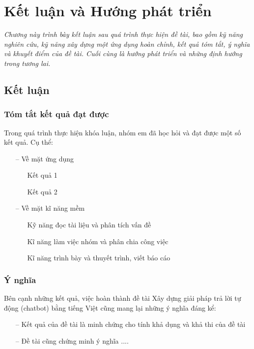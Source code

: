 \chapter{Kết luận và Hướng phát triển}
\label{Chapter6}

\emph{Chương này trình bày kết luận sau quá trình thực hiện đề tài, bao gồm kỹ năng nghiên cứu, kỹ năng xây dựng một ứng dụng hoàn chỉnh, kết quả tóm tắt, ý nghĩa và khuyết điểm của đề tài. Cuối cùng là hướng phát triển và những định hướng trong tương lai.}

\section{Kết luận}
\label{sec:ket-luan}

\subsection{Tóm tắt kết quả đạt được}

Trong quá trình thực hiện khóa luận, nhóm em đã học hỏi và đạt được một số kết quả. Cụ thể:

\begin{itemize}
    \item[--] Về mặt ứng dụng
        \begin{itemize}
            \item[\textbullet] Kết quả 1
            \item[\textbullet] Kết quả 2
        \end{itemize}
    \item[--] Về mặt kĩ năng mềm
        \begin{itemize}
            \item[\textbullet] Kỹ năng đọc tài liệu và phân tích vấn đề
            \item[\textbullet] Kĩ năng làm việc nhóm và phân chia công việc
            \item[\textbullet] Kĩ năng trình bày và thuyết trình, viết báo cáo
        \end{itemize}
\end{itemize}

\subsection{Ý nghĩa}
Bên cạnh những kết quả, việc hoàn thành đề tài Xây dựng giải pháp trả lời tự động (chatbot) bằng tiếng Việt cũng mang lại những ý nghĩa đáng kể:

\begin{itemize}
    \item[--] Kết quả của đề tài là minh chứng cho tính khả dụng và khả thi của đề tài
    \item[--] Đề tài cũng chứng minh ý nghĩa ....
\end{itemize}

